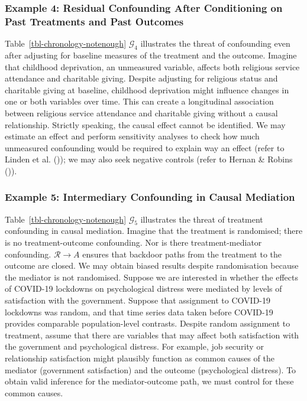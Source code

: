 \documentclass[
  single column]{article}
\begin{document}
\subsubsection{Example 4: Residual Confounding After Conditioning on
Past Treatments and Past
Outcomes}\label{example-4-residual-confounding-after-conditioning-on-past-treatments-and-past-outcomes}

Table~\ref{tbl-chronology-notenough} \(\mathcal{G}_{4}\) illustrates the
threat of confounding even after adjusting for baseline measures of the
treatment and the outcome. Imagine that childhood deprivation, an
unmeasured variable, affects both religious service attendance and
charitable giving. Despite adjusting for religious status and charitable
giving at baseline, childhood deprivation might influence changes in one
or both variables over time. This can create a longitudinal association
between religious service attendance and charitable giving without a
causal relationship. Strictly speaking, the causal effect cannot be
identified. We may estimate an effect and perform sensitivity analyses
to check how much unmeasured confounding would be required to explain
way an effect (refer to Linden et al.
()); we may also seek negative
controls (refer to Hernan \& Robins
()).

\subsubsection{Example 5: Intermediary Confounding in Causal
Mediation}\label{example-5-intermediary-confounding-in-causal-mediation}

Table~\ref{tbl-chronology-notenough} \(\mathcal{G}_5\) illustrates the
threat of treatment confounding in causal mediation. Imagine that the
treatment is randomised; there is no treatment-outcome confounding. Nor
is there treatment-mediator confounding. \(\mathcal{R} \to A\) ensures
that backdoor paths from the treatment to the outcome are closed. We may
obtain biased results despite randomisation because the mediator is not
randomised. Suppose we are interested in whether the effects of COVID-19
lockdowns on psychological distress were mediated by levels of
satisfaction with the government. Suppose that assignment to COVID-19
lockdowns was random, and that time series data taken before COVID-19
provides comparable population-level contrasts. Despite random
assignment to treatment, assume that there are variables that may affect
both satisfaction with the government and psychological distress. For
example, job security or relationship satisfaction might plausibly
function as common causes of the mediator (government satisfaction) and
the outcome (psychological distress). To obtain valid inference for the
mediator-outcome path, we must control for these common causes.
\end{document}
